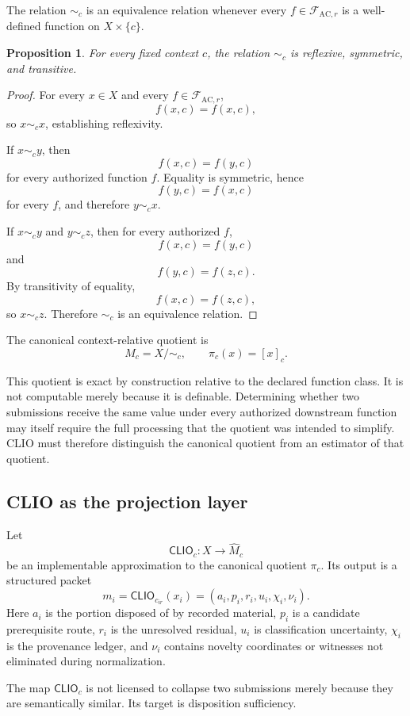 \documentclass[11pt]{article}
\newtheorem{proposition}[definition]{Proposition}
\theoremstyle{definition}
\newcommand{\F}{\mathcal{F}}
\newcommand{\CLIO}{\mathsf{CLIO}}
\begin{document}
The relation \(\sim_c\) is an equivalence relation whenever every \(f\in\F_{\mathrm{AC},r}\) is a well-defined function on \(X\times\{c\}\).

\begin{proposition}
For every fixed context \(c\), the relation \(\sim_c\) is reflexive, symmetric, and transitive.
\end{proposition}

\begin{proof}
For every \(x\in X\) and every \(f\in\F_{\mathrm{AC},r}\),
\[
f(x,c)=f(x,c),
\]
so \(x\sim_c x\), establishing reflexivity.

If \(x\sim_c y\), then
\[
f(x,c)=f(y,c)
\]
for every authorized function \(f\). Equality is symmetric, hence
\[
f(y,c)=f(x,c)
\]
for every \(f\), and therefore \(y\sim_c x\).

If \(x\sim_c y\) and \(y\sim_c z\), then for every authorized \(f\),
\[
f(x,c)=f(y,c)
\]
and
\[
f(y,c)=f(z,c).
\]
By transitivity of equality,
\[
f(x,c)=f(z,c),
\]
so \(x\sim_c z\). Therefore \(\sim_c\) is an equivalence relation.
\end{proof}

The canonical context-relative quotient is
\[
M_c
=
X/{\sim_c},
\qquad
\pi_c(x)
=
[x]_c.
\]

This quotient is exact by construction relative to the declared function class. It is not computable merely because it is definable. Determining whether two submissions receive the same value under every authorized downstream function may itself require the full processing that the quotient was intended to simplify. CLIO must therefore distinguish the canonical quotient from an estimator of that quotient.

\subsection{CLIO as the projection layer}

Let
\[
\CLIO_c:X\longrightarrow \widehat{M}_c
\]
be an implementable approximation to the canonical quotient \(\pi_c\). Its output is a structured packet
\[
m_i
=
\CLIO_{c_{ir}}(x_i)
=
(a_i,p_i,r_i,u_i,\chi_i,\nu_i).
\]
Here \(a_i\) is the portion disposed of by recorded material, \(p_i\) is a candidate prerequisite route, \(r_i\) is the unresolved residual, \(u_i\) is classification uncertainty, \(\chi_i\) is the provenance ledger, and \(\nu_i\) contains novelty coordinates or witnesses not eliminated during normalization.

The map \(\CLIO_c\) is not licensed to collapse two submissions merely because they are semantically similar. Its target is disposition sufficiency.
\end{document}
